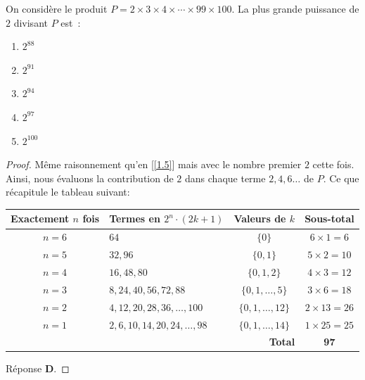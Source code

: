 %
On considère le produit $P = 2 \times 3 \times 4 \times \cdots \times 99 \times 100$.
La plus grande puissance de $2$ divisant $P$ est~:
\begin{enumerate}
  \item $2^{88}$
  \item $2^{91}$
  \item $2^{94}$
  \item $2^{97}$
  \item $2^{100}$
\end{enumerate}
%
%
\begin{proof}
Même raisonnement qu'en [\ref{1.5}] mais avec le nombre premier $2$ cette fois. 
Ainsi, nous évaluons la contribution de $2$ dans chaque terme $2, 4, 6 \dots$ de $P$. Ce que récapitule le tableau suivant:
\smallskip %

\begin{table}[H]
  \centering
  \renewcommand{\arraystretch}{1.5}
  \begin{tabular}{|c|l|c|c|} %
  \hline
  \textbf{Exactement $n$ fois} & \textbf{Termes en $2^n \cdot (2k+1)$} & \textbf{Valeurs de $k$} & \textbf{Sous-total} \\
  \hline
    $n = 6$ & $64$ & $\{0\}$ & $6 \times 1 = 6$ \\
    $n = 5$ & $32, 96$ & $\{0, 1\}$ & $5 \times 2 = 10$ \\
    $n = 4$ & $16, 48, 80$ & $\{0, 1, 2\}$ & $4 \times 3 = 12$ \\
    $n = 3$ & $8, 24, 40, 56, 72, 88$ & $\{0, 1, \dots, 5\}$ & $3 \times 6 = 18$ \\
    $n = 2$ & $4, 12, 20, 28, 36, \dots, 100$ & $\{0, 1, \dots, 12\}$ & $2 \times 13 = 26$ \\
    $n = 1$ & $2, 6, 10, 14,  20, 24, \dots, 98$ & $\{0, 1, \dots, 14\}$ & $1 \times 25 = 25$ \\
  \hline
  \multicolumn{3}{|r|}{\textbf{Total}} & \textbf{97}  \\
  \hline
  \end{tabular}
\end{table}

\noindent Réponse \textbf{D}.
\end{proof}